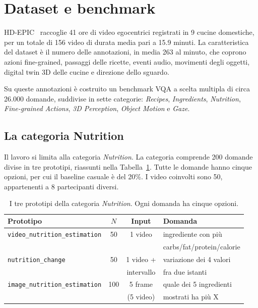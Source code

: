 \documentclass{article}
\begin{document}
\section{Dataset e benchmark}

HD-EPIC~\cite{hdepic} raccoglie 41 ore di video egocentrici
registrati in 9 cucine domestiche, per un totale di 156 video di durata
media pari a 15.9 minuti. La caratteristica del dataset è il numero delle
annotazioni, in media 263 al minuto, che coprono azioni fine-grained, passaggi
delle ricette, eventi audio, movimenti degli oggetti, digital twin 3D delle
cucine e direzione dello sguardo.

Su queste annotazioni è costruito un benchmark VQA a scelta multipla di circa
26.000 domande, suddivise in sette categorie: \emph{Recipes}, \emph{Ingredients},
\emph{Nutrition}, \emph{Fine-grained Actions}, \emph{3D Perception},
\emph{Object Motion} e \emph{Gaze}.

\subsection{La categoria Nutrition}

Il lavoro si limita alla categoria \emph{Nutrition}. La categoria comprende 200 domande divise in tre prototipi, riassunti nella
Tabella~\ref{tab:prototipi}. Tutte le domande hanno cinque opzioni, per cui il
baseline casuale è del 20\%. I video coinvolti sono 50, appartenenti a 8
partecipanti diversi.

\begin{table}[htbp]
\centering
\small
\begin{tabular}{@{}lccl@{}}
\toprule
Prototipo & $N$ & Input & Domanda \\
\midrule
\texttt{video\_nutrition\_estimation} & 50 & 1 video & ingrediente con più \\
 & & & carbs/fat/protein/calorie \\[2pt]
\texttt{nutrition\_change} & 50 & 1 video + & variazione dei 4 valori \\
 & & intervallo & fra due istanti \\[2pt]
\texttt{image\_nutrition\_estimation} & 100 & 5 frame & quale dei 5 ingredienti \\
 & & (5 video) & mostrati ha più X \\
\bottomrule
\end{tabular}
\caption{I tre prototipi della categoria \emph{Nutrition}. Ogni domanda ha cinque opzioni.}
\label{tab:prototipi}
\end{table}
\end{document}
